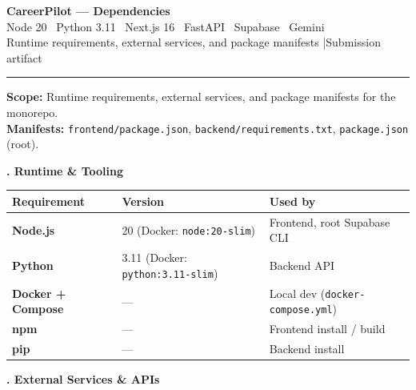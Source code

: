 \documentclass[11pt,a4paper]{article}
\newcommand{\pkg}[1]{\texttt{#1}}
\newcommand{\sectiontitle}[1]{%
  \vspace{0.9em}%
  \noindent
  \colorbox{sectiontitlebg}{%
    \parbox{\dimexpr\linewidth-2\fboxsep}{%
      \vspace{6pt}%
      {\fontsize{18}{22}\bfseries\selectfont #1}%
      \vspace{6pt}%
    }%
  }%
  \par\vspace{0.55em}%
}
\begin{document}
\begin{center}
  {\LARGE\bfseries CareerPilot --- Dependencies}\\[0.4em]
  {\small Node 20 \textbullet\ Python 3.11 \textbullet\ Next.js 16 \textbullet\ FastAPI \textbullet\ Supabase \textbullet\ Gemini}\\[0.2em]
  {\footnotesize Runtime requirements, external services, and package manifests \quad|\quad Submission artifact}
\end{center}
\vspace{0.5em}
\hrule
\vspace{0.8em}

\begin{scopebox}
\textbf{Scope:} Runtime requirements, external services, and package manifests for the monorepo.\\
\textbf{Manifests:}
\pkg{frontend/package.json},
\pkg{backend/requirements.txt},
\pkg{package.json} (root).
\end{scopebox}

\sectiontitle{1. Runtime \& Tooling}

\begin{center}
\small
\renewcommand{\arraystretch}{1.28}
\begin{tabularx}{\linewidth}{@{}L{3.2cm} L{4.8cm} X@{}}
\toprule
\textbf{Requirement} & \textbf{Version} & \textbf{Used by} \\
\midrule
\textbf{Node.js} & 20 (Docker: \pkg{node:20-slim}) & Frontend, root Supabase CLI \\
\textbf{Python} & 3.11 (Docker: \pkg{python:3.11-slim}) & Backend API \\
\textbf{Docker + Compose} & --- & Local dev (\pkg{docker-compose.yml}) \\
\textbf{npm} & --- & Frontend install / build \\
\textbf{pip} & --- & Backend install \\
\bottomrule
\end{tabularx}
\end{center}

\sectiontitle{2. External Services \& APIs}
\end{document}
